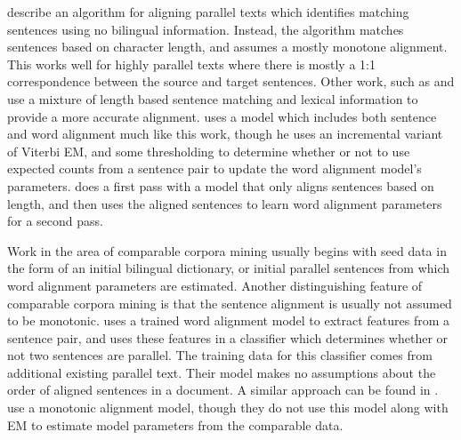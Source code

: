\documentclass[11pt,letterpaper]{article}
\newcommand{\remove}[1]{}
\newcommand{\Note}[1]{}
\newcommand{\NoteJS}[1]{\Note{#1~--JS}}
\begin{document}
 describe an algorithm for aligning parallel texts which
identifies matching sentences using no bilingual information. Instead, the
algorithm matches sentences based on character length, and assumes a mostly
monotone alignment. This works well for highly parallel texts where there is
mostly a 1:1 correspondence between the source and target sentences. Other work,
such as  and  use a mixture of length based
sentence matching and lexical information to provide a more accurate alignment.
 uses a model which includes both sentence and word alignment
much like this work, though he uses an incremental variant of Viterbi EM, and
some thresholding to determine whether or not to use expected counts from a
sentence pair to update the word alignment model's parameters. 
does a first pass with a model that only aligns sentences based on length, and
then uses the aligned sentences to learn word alignment parameters for a second
pass.

Work in the area of comparable corpora mining usually begins with seed data in
the form of an initial bilingual dictionary, or initial parallel sentences from
which word alignment parameters are estimated. Another distinguishing feature of
comparable corpora mining is that the sentence alignment is usually not assumed
to be monotonic.  uses a trained word alignment model to
extract features from a sentence pair, and uses these features in a classifier which determines
whether or not two sentences are parallel. The training data for this classifier
comes from additional existing parallel text. Their model makes no assumptions
about the order of aligned sentences in a document. A similar approach can be
found in \cite{Fung04a,Fung04b,Wu05,Tillmann09a,Tillmann09b}. 
use a monotonic alignment model, though they do not use this model along with EM
to estimate model parameters from the comparable data.

\remove{
\subsubsection{Extensions to the Model}
\label{sec:extensions}
\NoteJS{Describe the different possible models to be used in place of Model 1
and methods for learning the $\lambda$ parameter. Moore's improvements to Model
1 may also be relevant, since sticking with Model 1 would keep us in $n^2$ time.
Also mention variational Bayes
and expectation regularization as possible ways to encode sparsity into the
model. Mention \cite{Oncina06} for its alternate stochastic edit distance model,
though it's not certain whether or not using a conditional model would make a
difference since we're not learning $p(S)$ or $p(T)$.
Alignment with dependency trees: Some kind of quasi-synchronous grammar approach
could be used for the word alignment if we have dependency parses of both sides
(maybe just one side?).}
}
\end{document}
